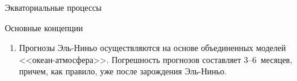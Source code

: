 \begin{chapter}{Экваториальные процессы}
\begin{section}{Основные концепции}
\begin{enumerate}
\item
Прогнозы Эль-Ниньо осуществляются на основе объединенных моделей
<<океан-атмосфера>>. Погрешность прогнозов%
 составляет 3--6~месяцев, 
причем, как правило, уже после зарождения Эль-Ниньо.
%
\end{enumerate}
\end{section}

\end{chapter}